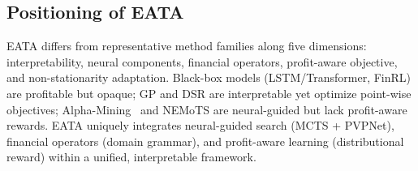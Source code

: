 \subsection{Positioning of EATA}

EATA differs from representative method families along five dimensions: interpretability, neural components, financial operators, profit-aware objective, and non-stationarity adaptation. Black-box models (LSTM/Transformer, FinRL) are profitable but opaque; GP and DSR are interpretable yet optimize point-wise objectives; Alpha-Mining~\cite{yu2023alphagen} and NEMoTS are neural-guided but lack profit-aware rewards. EATA uniquely integrates neural-guided search (MCTS + PVPNet), financial operators (domain grammar), and profit-aware learning (distributional reward) within a unified, interpretable framework.
